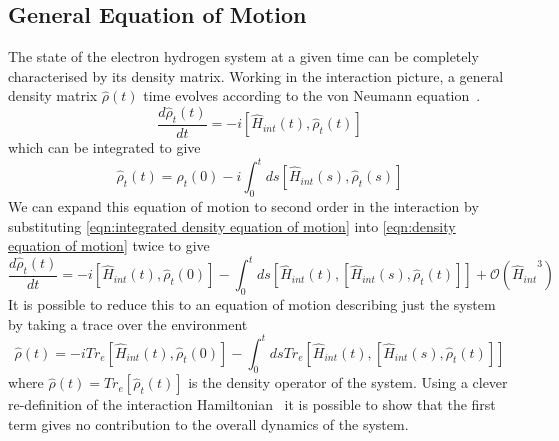 
\subsection{General Equation of Motion}
The state of the electron hydrogen
system at a given time can be completely
characterised by its density
matrix.
Working in the interaction
picture, a general density matrix
\(\hat{\rho}(t)\) time evolves according
to the von Neumann equation~\cite{TP2_Notes}.
\begin{equation}
    \frac{d\hat{\rho}_t(t)}{dt} =
    -i [\hat{H}_{int}(t), \hat{\rho}_t(t)]
    \label{eqn:density equation of motion}
\end{equation}
which can be integrated to give
\begin{equation}
    \hat{\rho}_t(t) =
    \hat{\rho}_t(0)
    - i \int_0^t ds
        [\hat{H}_{int}(s), \hat{\rho}_t(s)]
    \label{eqn:integrated density equation of motion}
\end{equation}
We can expand this equation of motion
to second order in the interaction
by substituting \cref{eqn:integrated density equation of motion}
into \cref{eqn:density equation of motion}
twice to give
\begin{equation}
    \frac{d\hat{\rho}_t(t)}{dt} =
    -i [\hat{H}_{int}(t), \hat{\rho}_t(0)]
    - \int_0^t ds
        [\hat{H}_{int}(t),
            [\hat{H}_{int}(s), \hat{\rho}_t(t)]]
    +\mathcal{O}({\hat{H}_{int}}^3)
    \label{eqn:second order eqn of motion}
\end{equation}
It is possible to reduce this to
an equation of motion
describing just the system by taking
a trace over the environment~\cite{Manzano_2020}
\begin{equation}
    \hat{\rho}(t) =
    -i Tr_e[\hat{H}_{int}(t), \hat{\rho}_t(0)]
    - \int_0^t ds
    Tr_e[\hat{H}_{int}(t),
    [\hat{H}_{int}(s), \hat{\rho}_t(t)]]
    \label{eqn:density motion before redfield approximation}
\end{equation}
where \(\hat{\rho}(t) = Tr_e[\hat{\rho}_t(t)]\)
is the density operator of the system.
Using a clever re-definition of the interaction
Hamiltonian~\cite{Manzano_2020} it
is possible to show that the first
term gives no contribution to the
overall dynamics of the system.

